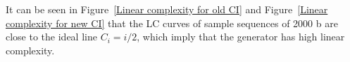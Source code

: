 It can be seen in Figure~\ref{Linear complexity for old CI} and Figure~\ref{Linear complexity for new CI} that the LC curves of sample sequences of 2000 b are close to the ideal line $C_i=i/2$, which imply that the generator has high linear complexity. 
\begin{figure}
\centering
{} \hspace{0.5cm}
 \hspace{0.5cm}

\end{figure}
